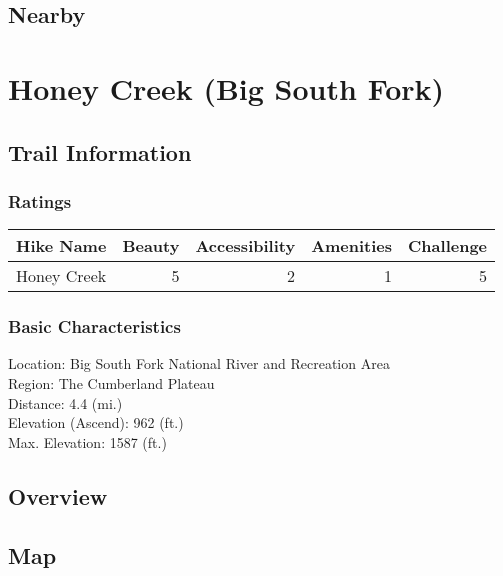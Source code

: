 \documentclass[
]{book}
\begin{document}
\hypertarget{nearby-9}{%
\section{Nearby}\label{nearby-9}}

\hypertarget{honey-creek-big-south-fork}{%
\chapter{Honey Creek (Big South Fork)}\label{honey-creek-big-south-fork}}

\hypertarget{trail-information-10}{%
\section{Trail Information}\label{trail-information-10}}

\hypertarget{ratings-5}{%
\subsection{Ratings}\label{ratings-5}}

\begin{tabular}{l|r|r|r|r}
\hline
Hike Name & Beauty & Accessibility & Amenities & Challenge\\
\hline
Honey Creek & 5 & 2 & 1 & 5\\
\hline
\end{tabular}

\hypertarget{basic-characteristics-10}{%
\subsection{Basic Characteristics}\label{basic-characteristics-10}}

Location: Big South Fork National River and Recreation Area\\
Region: The Cumberland Plateau\\
Distance: 4.4 (mi.)\\
Elevation (Ascend): 962 (ft.)\\
Max. Elevation: 1587 (ft.)

\hypertarget{overview-10}{%
\section{Overview}\label{overview-10}}

\hypertarget{map-10}{%
\section{Map}\label{map-10}}
\end{document}

